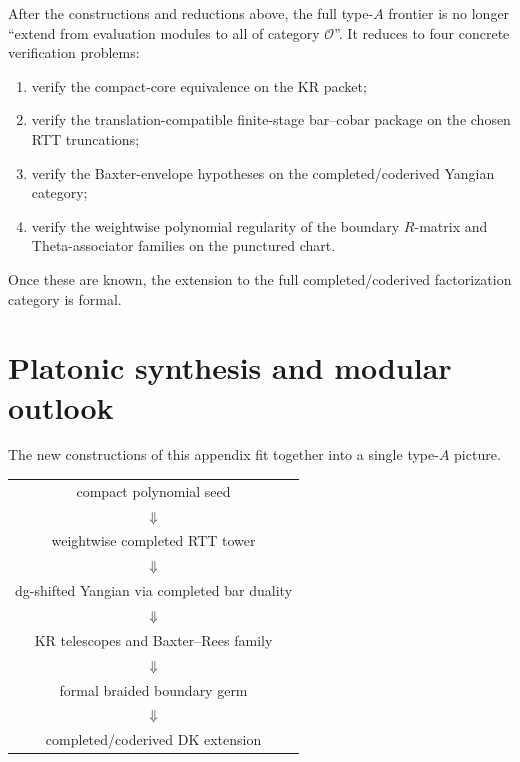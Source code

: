 \begin{corollary}
\ClaimStatusProvedHere
\label{cor:what-remains-after-present-appendix}
After the constructions and reductions above, the full type-$A$ frontier
is no longer ``extend from evaluation modules to all of category
$\mathcal O$''. It reduces to four concrete verification problems:
\begin{enumerate}
 \item verify the compact-core equivalence on the KR packet;
 \item verify the translation-compatible finite-stage bar--cobar
 package on the chosen RTT truncations;
 \item verify the Baxter-envelope hypotheses on the completed/coderived
 Yangian category;
 \item verify the weightwise polynomial regularity of the boundary
 $R$-matrix and Theta-associator families on the punctured chart.
\end{enumerate}
Once these are known, the extension to the full completed/coderived
factorization category is formal.
\end{corollary}

\section{Platonic synthesis and modular outlook}
\label{sec:typeA-platonic-synthesis-outlook}

The new constructions of this appendix fit together into a single type-$A$
picture.

\begin{center}
\begin{tabular}{c}
compact polynomial seed \\
$\Downarrow$ \\
weightwise completed RTT tower \\
$\Downarrow$ \\
dg-shifted Yangian via completed bar duality \\
$\Downarrow$ \\
KR telescopes and Baxter--Rees family \\
$\Downarrow$ \\
formal braided boundary germ \\
$\Downarrow$ \\
completed/coderived DK extension
\end{tabular}
\end{center}


